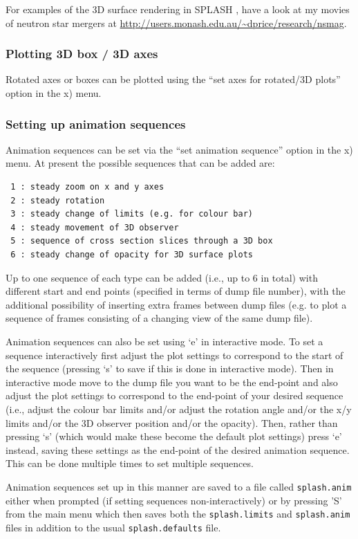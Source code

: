 \documentclass[a4paper,10pt]{article}
\newcommand{\splash}{\textsc{SPLASH }}
\begin{document}
 For examples of the 3D surface rendering in \splash, have a look at my movies of neutron star mergers at \url{http://users.monash.edu.au/~dprice/research/nsmag}.

\subsubsection{ Plotting 3D box / 3D axes}
Rotated axes or boxes can be plotted using the ``set axes for rotated/3D plots'' option in the x) menu.

\subsubsection{ Setting up animation sequences}
\label{sec:animseq}
 Animation sequences can be set via the ``set animation sequence'' option in the x) menu. At present the possible sequences that can be added are:
\begin{verbatim}
 1 : steady zoom on x and y axes                       
 2 : steady rotation                                   
 3 : steady change of limits (e.g. for colour bar)     
 4 : steady movement of 3D observer                    
 5 : sequence of cross section slices through a 3D box 
 6 : steady change of opacity for 3D surface plots
\end{verbatim}
 Up to one sequence of each type can be added (i.e., up to 6 in total) with different start and end points (specified in terms of dump file number), with the additional possibility of inserting extra frames between dump files (e.g. to plot a sequence of frames consisting of a changing view of the same dump file). 
 
 Animation sequences can also be set using `e' in interactive mode. To set a sequence interactively first adjust the plot settings to correspond to the start of the sequence (pressing `s' to save if this is done in interactive mode). Then in interactive mode move to the dump file you want to be the end-point and also adjust the plot settings to correspond to the end-point of your desired sequence (i.e., adjust the colour bar limits and/or adjust the rotation angle and/or the x/y limits and/or the 3D observer position and/or the opacity). Then, rather than pressing `s' (which would make these become the default plot settings) press `e' instead, saving these settings as the end-point of the desired animation sequence. This can be done multiple times to set multiple sequences.
 
  Animation sequences set up in this manner are saved to a file called \verb+splash.anim+ either when prompted (if setting sequences non-interactively) or by pressing 'S' from the main menu which then saves both the \verb+splash.limits+ and \verb+splash.anim+ files in addition to the usual \verb+splash.defaults+ file.
  
\end{document}
